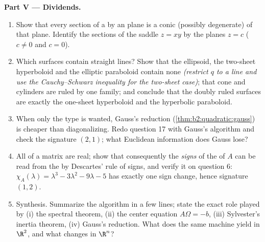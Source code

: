 \begin{problem}
\medskip
\noindent\textbf{Part V --- Dividends.}
\begin{enumerate}[resume]
  \item Show that every section of a  by an 
        plane is a conic (possibly degenerate) of that plane.
        Identify the sections of the saddle $z = xy$ by the
        planes $z = c$ ($c \neq 0$ and $c = 0$).
  \item Which  surfaces contain straight lines? Show
        that the ellipsoid, the two-sheet hyperboloid and the
        elliptic paraboloid contain none \emph{(restrict $q$
        to a line and use the Cauchy--Schwarz inequality for
        the two-sheet case)}; that cone and cylinders are
        ruled by one family; and conclude that the doubly
        ruled  surfaces are exactly the one-sheet
        hyperboloid and the hyperbolic paraboloid.
  \item When only the \emph{} type is wanted, Gauss's
        reduction (\cref{thm:b2:quadratic:gauss}) is cheaper
        than diagonalizing. Redo question 17 with Gauss's
        algorithm and check the signature $(2, 1)$; what
        Euclidean information does Gauss lose?
  \item All  of a  matrix are real; show
        that consequently the \emph{signs} of the 
        of $A$ can be read from the 
        by Descartes' rule of signs, and verify it on
        question 6: $\chi_A(\lambda) = \lambda^3 - 3\lambda^2
        - 9\lambda - 5$ has exactly one sign change, hence
        signature $(1, 2)$.
  \item Synthesis. Summarize the algorithm in a few lines;
        state the exact role played by (i) the spectral
        theorem, (ii) the center equation $A\Omega = -b$,
        (iii) Sylvester's inertia theorem, (iv) Gauss's
        reduction. What does the same machine yield in
        $\R^2$, and what changes in $\R^n$?
\end{enumerate}
\end{problem}
